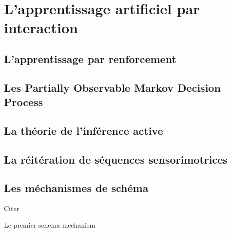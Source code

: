 \chapter{L'apprentissage artificiel par interaction}



\section{L'apprentissage par renforcement}


\section{Les Partially Observable Markov Decision Process}


\section{La théorie de l'inférence active}


\section{La réitération de séquences sensorimotrices}


\section{Les méchanismes de schéma}

Citer  \cite{drescher_made-up_1991}

Le premier schema mechanism


